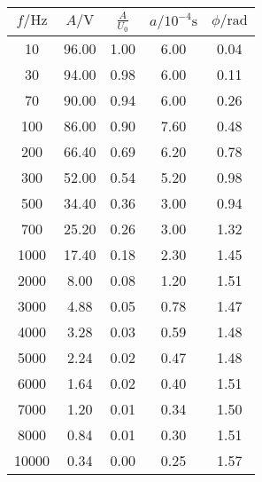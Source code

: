 \label{tab:tabb}
	\begin{tabular}{S[table-format=5.0]S[table-format=2.2]S[table-format=2.2]S[table-format=1.2]S[table-format=1.2]}
		\toprule
		{$f/\si{\hertz}$} & {$A/\si{\volt}$} & {$\frac{A}{U_0}$} & {$a/10^{-4}\si{\second}$} & {$\phi/\si{\radian}$} \\
		 & 96.00 & 1.00 & 6.00 & 0.04 \\
		   30 & 94.00 & 0.98 & 6.00 & 0.11 \\
		   70 & 90.00 & 0.94 & 6.00 & 0.26 \\
		  100 & 86.00 & 0.90 & 7.60 & 0.48 \\
		  200 & 66.40 & 0.69 & 6.20 & 0.78 \\
		  300 & 52.00 & 0.54 & 5.20 & 0.98 \\
		  500 & 34.40 & 0.36 & 3.00 & 0.94 \\
		  700 & 25.20 & 0.26 & 3.00 & 1.32 \\
		 1000 & 17.40 & 0.18 & 2.30 & 1.45 \\
		 2000 & 8.00 & 0.08 & 1.20 & 1.51 \\
		 3000 & 4.88 & 0.05 & 0.78 & 1.47 \\
		 4000 & 3.28 & 0.03 & 0.59 & 1.48 \\
		 5000 & 2.24 & 0.02 & 0.47 & 1.48 \\
		 6000 & 1.64 & 0.02 & 0.40 & 1.51 \\
		 7000 & 1.20 & 0.01 & 0.34 & 1.50 \\
		 8000 & 0.84 & 0.01 & 0.30 & 1.51 \\
		10000 & 0.34 & 0.00 & 0.25 & 1.57 \\
		\bottomrule
	\end{tabular}

